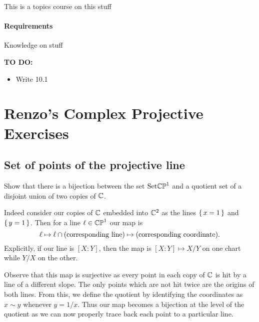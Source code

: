 \documentclass[12pt]{memoir}
\begin{document}
\maketitle
{\small 
\setlength{\parindent}{0em}
\setlength{\parskip}{1em}

This is a topics course on this stuff

\subsubsection*{Requirements}
Knowledge on stuff\par 

\textbf{TO DO:}
\begin{itemize}
    \item Write 10.1
\end{itemize}
}
\newpage
\tableofcontents
\chapter{Renzo's Complex Projective Exercises}

\section{Set of points of the projective line}

\begin{Ej}
    Show that there is a bijection between the set $\text{Set}\mathbb{CP}^1$
 and a quotient set of a disjoint union of two copies of $\mathbb{C}$.
\end{Ej}

\begin{ptcbr}
    Indeed consider our copies of $\mathbb{C}$ embedded into $\mathbb{C}^2$ as the lines $\{\,x=1\,\}$ and $\{\,y=1\,\}$. Then for a line $\ell\in\mathbb{CP}^1$ our map is 
    $$\ell\mapsto \ell\cap(\text{corresponding line})\mapsto (\text{corresponding coordinate}).$$
    Explicitly, if our line is $[X:Y]$, then the map is $[X:Y]\mapsto X/Y$ on one chart while $Y/X$ on the other.\par 
    Observe that this map is surjective as every point in each copy of $\mathbb{C}$ is hit by a line of a different slope. The only points which are not hit twice are the origins of both lines. From this, we define the quotient by identifying the coordinates as $x\sim y$ whenever $y=1/x$. Thus our map becomes a bijection at the level of the quotient as we can now properly trace back each point to a particular line. 
\end{ptcbr}
\end{document}

